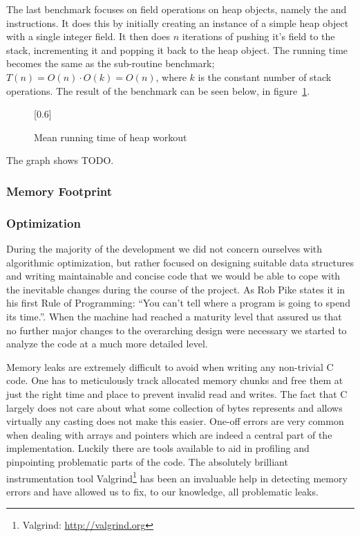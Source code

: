 
The last benchmark focuses on field operations on heap objects, namely the
 and  instructions. It does
this by initially creating an instance of a simple heap object with a single
integer field. It then does $n$ iterations of pushing it's field to the stack,
incrementing it and popping it back to the heap object. The running time becomes
the same as the sub-routine benchmark; $T(n) = O(n) \cdot O(k) = O(n)$, where
$k$ is the constant number of stack operations. The result of the
benchmark can be seen below, in figure~\ref{fig:eval:benchmark:heap}.
\begin{figure}[H]
  \centering
  \scalebox{0.8}[0.6]{}
  \caption{Mean running time of heap workout}
\label{fig:eval:benchmark:heap}
\end{figure}

The graph shows TODO.


\subsubsection{Memory Footprint}

\subsubsection{Optimization}

During the majority of the development we did not concern ourselves with
algorithmic optimization, but rather focused on designing suitable data
structures and writing maintainable and concise code that we would be able to
cope with the inevitable changes during the course of the project. As Rob Pike
states it in his first Rule of Programming: ``You can't tell where a program is
going to spend its time.''\cite{pike-rules}. When the machine had reached a
maturity level that assured us that no further major changes to the overarching
design were necessary we started to analyze the code at a much more detailed
level.

Memory leaks are extremely difficult to avoid when writing any non-trivial C
code. One has to meticulously track allocated memory chunks and free them at
just the right time and place to prevent invalid read and writes. The fact that
C largely does not care about what some collection of bytes represents and
allows virtually any casting does not make this easier. One-off errors are very
common when dealing with arrays and pointers which are indeed a central part of
the \thename{} implementation. Luckily there are tools available to aid in
profiling and pinpointing problematic parts of the code. The absolutely
brilliant instrumentation tool Valgrind\footnote{Valgrind:
  \url{http://valgrind.org}} has been an invaluable help in detecting memory
errors and have allowed us to fix, to our knowledge, all problematic leaks.

